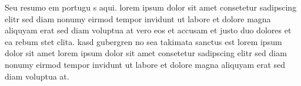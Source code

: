 \documentclass{article}
\begin{document}
\begin{resumo}
Seu resumo em portugu s aqui. lorem ipsum dolor sit amet
consetetur sadipscing elitr sed diam nonumy eirmod tempor invidunt
ut labore et dolore magna aliquyam erat sed diam voluptua at vero
eos et accusam et justo duo dolores et ea rebum stet clita.  kasd
gubergren no sea takimata sanctus est lorem ipsum dolor sit amet
lorem ipsum dolor sit amet consetetur sadipscing elitr sed diam
nonumy eirmod tempor invidunt ut labore et dolore magna aliquyam
erat sed diam voluptua at.
\end{resumo}

\begin{abstract}
Your abstract in English here. lorem ipsum dolor sit amet
consetetur sadipscing elitr sed diam nonumy eirmod tempor invidunt
ut labore et dolore magna aliquyam erat sed diam voluptua at vero
eos et accusam et justo duo dolores et ea rebum stet clita kasd
gubergren no sea takimata sanctus est lorem ipsum dolor sit amet
lorem ipsum dolor sit amet consetetur sadipscing elitr sed diam
nonumy eirmod tempor invidunt ut labore et dolore magna aliquyam
erat sed diam voluptua at
\end{abstract}



\listofalgorithms    %
\listofacronyms      %
\listofsymbols       %


\end{document}

